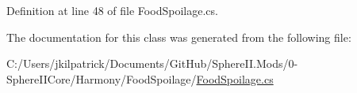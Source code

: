 Definition at line 48 of file Food\+Spoilage.\+cs.



The documentation for this class was generated from the following file\+:\begin{DoxyCompactItemize}
\item 
C\+:/\+Users/jkilpatrick/\+Documents/\+Git\+Hub/\+Sphere\+I\+I.\+Mods/0-\/\+Sphere\+I\+I\+Core/\+Harmony/\+Food\+Spoilage/\mbox{\hyperlink{_food_spoilage_8cs}{Food\+Spoilage.\+cs}}\end{DoxyCompactItemize}
